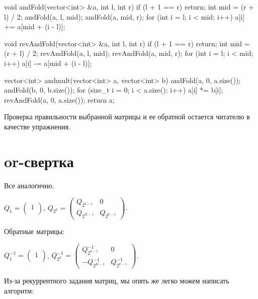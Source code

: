 \begin{code}
    
void andFold(vector<int> &a, int l, int r) {
    if (l + 1 == r) {
        return;
    }
    int mid = (r + l) / 2;
    andFold(a, l, mid);
    andFold(a, mid, r);
    for (int i = l; i < mid; i++) {
        a[i] += a[mid + (i - l)];
    }
}

void revAndFold(vector<int> &a, int l, int r) {
    if (l + 1 == r) {
        return;
    }
    int mid = (r + l) / 2;
    revAndFold(a, l, mid);
    revAndFold(a, mid, r);
    for (int i = l; i < mid; i++) {
        a[i] -= a[mid + (i - l)];
    }
}

vector<int> andmult(vector<int> a, vector<int> b) {
    andFold(a, 0, a.size());
    andFold(b, 0, b.size());
    for (size_t i = 0; i < a.size(); i++) {
        a[i] *= b[i];
    }
    revAndFold(a, 0, a.size());
    return a;
}

\end{code}

Проверка правильности выбранной матрицы и ее обратной остается читателю в качестве упражнения.


\section{or-свертка}

Все аналогично.

$Q_1 = \begin{pmatrix}
    1\\
\end{pmatrix}
$,
$
Q_{2^k} =  \begin{pmatrix}
    Q_{2^{k - 1}} & 0\\
    Q_{2^{K - 1}} & Q_{2^{k - 1}}
\end{pmatrix}
$.


Обратные матрицы:

$Q_1^{-1} = \begin{pmatrix}
    1\\
\end{pmatrix}
$,
$
Q_{2^k}^{-1} =  \begin{pmatrix}
    Q_{2^{k - 1}}^{-1} & 0\\
    -Q_{2^{K - 1}}^{-1} & Q_{2^{k - 1}}^{-1}
\end{pmatrix}
$.


Из-за рекуррентного задания матриц, мы опять же легко можем написать алгоритм:

